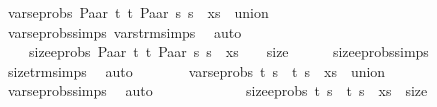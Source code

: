 \begin{isabellebody}
\ {\isachardoublequoteopen}vars{\isacharunderscore}{\kern0pt}eprobs\ {\isacharparenleft}{\kern0pt}{\isacharparenleft}{\kern0pt}Paar\ t{}\ t{}{\isacharcomma}{\kern0pt}\ Paar\ s{}\ s{}{\isacharparenright}{\kern0pt}\ {\isacharhash}{\kern0pt}\ xs{\isacharparenright}{\kern0pt}\ {\isacharequal}{\kern0pt}\ {\isacharquery}{\kern0pt}union{\isachardoublequoteclose}\isanewline
\ \ \ \ \isamarkupfalse%
\ vars{\isacharunderscore}{\kern0pt}eprobs{\isachardot}{\kern0pt}simps\ vars{\isacharunderscore}{\kern0pt}trm{\isachardot}{\kern0pt}simps\ \isamarkupfalse%
\ auto\isanewline
\ \ \isamarkupfalse%
\ \isamarkupfalse%
\ {}\ \isamarkupfalse%
\isanewline
\ \ \ \ {\isachardoublequoteopen}size{\isacharunderscore}{\kern0pt}eprobs\ {\isacharparenleft}{\kern0pt}{\isacharparenleft}{\kern0pt}Paar\ t{}\ t{}{\isacharcomma}{\kern0pt}\ Paar\ s{}\ s{}{\isacharparenright}{\kern0pt}\ {\isacharhash}{\kern0pt}\ xs{\isacharparenright}{\kern0pt}\ {\isacharequal}{\kern0pt}\ {}\ {\isacharplus}{\kern0pt}\ {\isacharquery}{\kern0pt}size{\isachardoublequoteclose}\isanewline
\ \ \ \ \isamarkupfalse%
\ size{\isacharunderscore}{\kern0pt}eprobs{\isachardot}{\kern0pt}simps\ \isamarkupfalse%
\ size{\isacharunderscore}{\kern0pt}trm{\isachardot}{\kern0pt}simps{\isacharparenleft}{\kern0pt}{}{\isacharparenright}{\kern0pt}\ \isamarkupfalse%
\ auto\isanewline
\ \ \isamarkupfalse%
\ {}\ \isamarkupfalse%
\isanewline
\ \ {\isachardoublequoteopen}vars{\isacharunderscore}{\kern0pt}eprobs\ {\isacharparenleft}{\kern0pt}{\isacharparenleft}{\kern0pt}t{}{\isacharcomma}{\kern0pt}\ s{}{\isacharparenright}{\kern0pt}\ {\isacharhash}{\kern0pt}\ {\isacharparenleft}{\kern0pt}t{}{\isacharcomma}{\kern0pt}\ s{}{\isacharparenright}{\kern0pt}\ {\isacharhash}{\kern0pt}\ xs{\isacharparenright}{\kern0pt}\ {\isacharequal}{\kern0pt}\ {\isacharquery}{\kern0pt}union{\isachardoublequoteclose}\isanewline
\ \ \ \ \isamarkupfalse%
\ vars{\isacharunderscore}{\kern0pt}eprobs{\isachardot}{\kern0pt}simps\ \isamarkupfalse%
\ auto\isanewline
\ \ \isamarkupfalse%
\ \isamarkupfalse%
\ {}\ \isamarkupfalse%
\ \isanewline
\ \ \ \ {\isachardoublequoteopen}size{\isacharunderscore}{\kern0pt}eprobs\ {\isacharparenleft}{\kern0pt}{\isacharparenleft}{\kern0pt}t{}{\isacharcomma}{\kern0pt}\ s{}{\isacharparenright}{\kern0pt}\ {\isacharhash}{\kern0pt}\ {\isacharparenleft}{\kern0pt}t{}{\isacharcomma}{\kern0pt}\ s{}{\isacharparenright}{\kern0pt}\ {\isacharhash}{\kern0pt}\ xs{\isacharparenright}{\kern0pt}\ {\isacharequal}{\kern0pt}\ {\isacharquery}{\kern0pt}size{\isachardoublequoteclose}\isanewline

\end{isabellebody}
